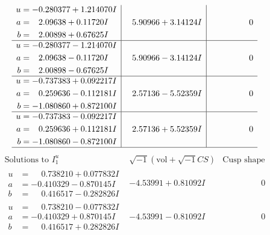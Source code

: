 \documentclass[1p]{elsarticle_modified}
\theoremstyle{definition}
\newcommand{\I}{\sqrt{-1}}
\begin{document}
$$\begin{array}{c|c|c}
\begin{aligned}
u &= -0.280377 + 1.214070 I \\
a &= \phantom{-}2.09638 + 0.11720 I \\
b &= \phantom{-}2.00898 + 0.67625 I\end{aligned}
 & \phantom{-}5.90966 + 3.14124 I & \phantom{-0.000000 } 0 \\ \hline\begin{aligned}
u &= -0.280377 - 1.214070 I \\
a &= \phantom{-}2.09638 - 0.11720 I \\
b &= \phantom{-}2.00898 - 0.67625 I\end{aligned}
 & \phantom{-}5.90966 - 3.14124 I & \phantom{-0.000000 } 0 \\ \hline\begin{aligned}
u &= -0.737383 + 0.092217 I \\
a &= \phantom{-}0.259636 - 0.112181 I \\
b &= -1.080860 + 0.872100 I\end{aligned}
 & \phantom{-}2.57136 - 5.52359 I & \phantom{-0.000000 } 0 \\ \hline\begin{aligned}
u &= -0.737383 - 0.092217 I \\
a &= \phantom{-}0.259636 + 0.112181 I \\
b &= -1.080860 - 0.872100 I\end{aligned}
 & \phantom{-}2.57136 + 5.52359 I & \phantom{-0.000000 } 0\\
 \hline 
 \end{array}$$\newpage$$\begin{array}{c|c|c}  
\text{Solutions to }I^u_{1}& \I (\text{vol} + \sqrt{-1}CS) & \text{Cusp shape}\\
 \hline 
\begin{aligned}
u &= \phantom{-}0.738210 + 0.077832 I \\
a &= -0.410329 - 0.870145 I \\
b &= \phantom{-}0.416517 - 0.282826 I\end{aligned}
 & -4.53991 + 0.81092 I & \phantom{-0.000000 } 0 \\ \hline\begin{aligned}
u &= \phantom{-}0.738210 - 0.077832 I \\
a &= -0.410329 + 0.870145 I \\
b &= \phantom{-}0.416517 + 0.282826 I\end{aligned}
 & -4.53991 - 0.81092 I & \phantom{-0.000000 } 0 \\ \hline\begin{aligned}

\end{aligned}
\end{array}$$
\end{document}
